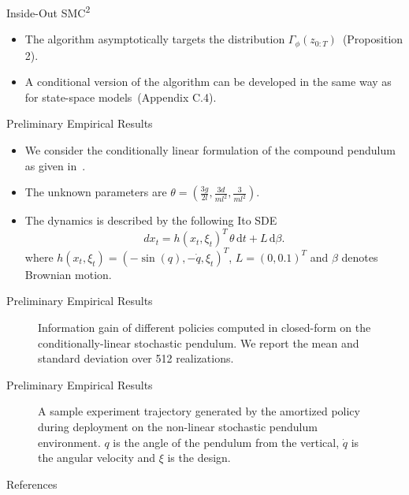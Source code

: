 \documentclass[10pt, aspectratio=1610]{beamer}
\newcommand{\dd}{\mathrm{d}}
\begin{document}
    \begin{frame}{Inside-Out \texorpdfstring{SMC\textsuperscript{2}}{SMC2}}
      \begin{itemize}
        \item The algorithm asymptotically targets the distribution $\Gamma_\phi(z_{0:T})$~(Proposition 2).
        \item A conditional version of the algorithm can be developed in the same way as for state-space models~(Appendix C.4).
      \end{itemize}
    \end{frame}

    \begin{frame}{Preliminary Empirical Results}
      \begin{itemize}
        \item We consider the conditionally linear formulation of the compound pendulum as given in~\citet{belusov2019belief}.
        \item The unknown parameters are $\theta = \displaystyle \left(\frac{3g}{2l}, \frac{3d}{ml^2}, \frac{3}{ml^2} \right)$.
        \item The dynamics is described by the following Ito SDE
          \begin{equation}
            dx_t = h(x_t, \xi_t)^T \, \theta \, \dd t + L \, \dd \beta.
          \end{equation}
          where $h(x_t, \xi_t) = (-\sin(q), -\dot{q}, \xi_t)^T$, $L = (0, 0.1)^T$ and $\beta$ denotes Brownian motion.
      \end{itemize}
    \end{frame}

    \begin{frame}{Preliminary Empirical Results}
      \begin{figure}[t]
        
        \vspace{-0.25cm}
        \caption{Information gain of different policies computed in closed-form on the conditionally-linear stochastic pendulum. We report the mean and standard deviation over 512 realizations.}
        \label{fig:pendulum_info_gain}
      \end{figure}
    \end{frame}

    \begin{frame}{Preliminary Empirical Results}
      \begin{figure}[!h]
        \centering
        
        \vspace{-0.25cm}
        \caption{A sample experiment trajectory generated by the amortized policy during deployment on the non-linear stochastic pendulum environment. $q$ is the angle of the pendulum from the vertical, $\dot{q}$ is the angular velocity and $\xi$ is the design.}
        \label{fig:pendulum_sample_trajectory}
      \end{figure}
    \end{frame}

  \begin{frame}[t, allowframebreaks]{References}
    
  \end{frame}
\end{document}
